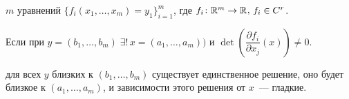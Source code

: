 \begin{NB*}
    $m$ уравнений $\{f_i(x_1,\ldots,x_m)=y_1\}_{i=1}^{m}$, где $f_i\colon \rmy\to\rmy[],\,f_i\in C^r$.
    
    Если при $y=(b_1,\ldots,b_m)\;\exists!\,x=(a_1,\ldots,a_m))$ и $\det\left(\dfrac{\partial f_i}{\partial x_j}(x)\right)\neq 0$.
    
    \THEN для всех $y$ близких к $(b_1,\ldots,b_m)$ существует единственное решение, оно будет близкое к $(a_1,\ldots,a_m)$, и зависимости этого решения от $x$~--- гладкие. 
\end{NB*}
\newpage

